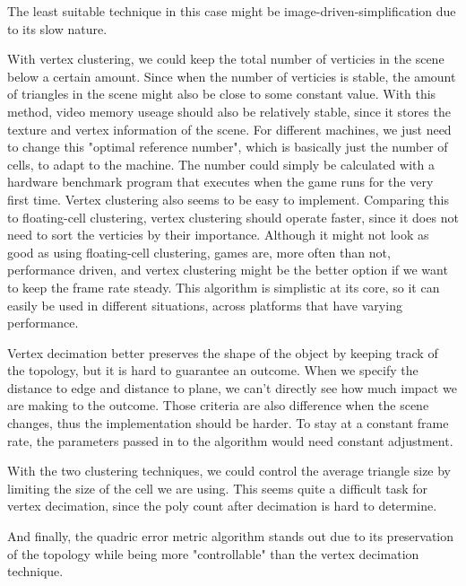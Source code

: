 \documentclass[12pt]{article}
\begin{document}
The least suitable technique in this case might be image-driven-simplification due to its slow nature. \par
With vertex clustering, we could keep the total number of verticies in the scene below a certain amount. Since when the number
of verticies is stable, the amount of triangles in the scene might also be close to some constant value. With this method, video 
memory useage should also be relatively stable, since it stores the texture and vertex information of the scene. For different 
machines, we just need to change this "optimal reference number", which is basically just the number of cells, 
to adapt to the machine. The number could simply be calculated with a hardware benchmark program that executes when the game 
runs for the very first time. Vertex clustering also seems to be easy to implement. Comparing this to floating-cell clustering,
vertex clustering should operate faster, since it does not need to sort the verticies by their importance. Although it might not look
as good as using floating-cell clustering, games are, more often than not, performance driven, and vertex clustering might be the 
better option if we want to keep the frame rate steady. This algorithm is simplistic at its core, so it can easily be used in
different situations, across platforms that have varying performance.\par

Vertex decimation better preserves the shape of the object by keeping track of the topology, but it is hard to guarantee an outcome.
When we specify the distance to edge and distance to plane, we can't directly see how much impact we are making to the outcome. Those
criteria are also difference when the scene changes, thus the implementation should be harder. To stay at a constant frame rate, 
the parameters passed in to the algorithm would need constant adjustment. \par

With the two clustering techniques, we could control the average triangle size by limiting the size of the cell we are using. This 
seems quite a difficult task for vertex decimation, since the poly count after decimation is hard to determine. \par

And finally, the quadric error metric algorithm stands out due to its preservation of the topology
while being more "controllable" than the vertex decimation technique.
\end{document}

